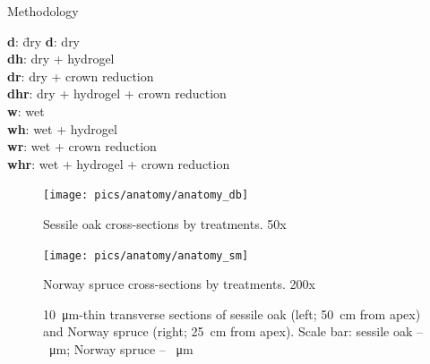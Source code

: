 \documentclass[final]{beamer}
\newlength{\colwidth}
\begin{document}
\begin{frame}[t]
\begin{columns}[t]
\begin{column}{\colwidth}
\begin{block}{Methodology}
\begin{minipage}[t]{0.45\textwidth}
\begin{tabbing}
    \textbf{d}: \quad\= dry \kill
    \textbf{d}: \> dry \\
    \textbf{dh}: \> dry + hydrogel \\
    \textbf{dr}: \> dry + crown reduction\\
    \textbf{dhr}: \> dry + hydrogel + crown reduction \\
    \textbf{w}: \> wet \\
    \textbf{wh}: \> wet + hydrogel \\
    \textbf{wr}: \> wet + crown reduction\\
    \textbf{whr}: \> wet + hydrogel + crown reduction
\end{tabbing}
\end{minipage}\hfill


\begin{figure}
    \begin{minipage}{0.5\textwidth}
        \centering \texttt{[image: pics/anatomy/anatomy\_db]}
        \caption*{Sessile oak cross-sections by treatments. 50x}
        \label{fig:anatomy_db}
    \end{minipage}\hfill
    \begin{minipage}{0.5\textwidth}
        \centering \texttt{[image: pics/anatomy/anatomy\_sm]}
        \caption*{Norway spruce cross-sections by treatments. 200x}
        \label{fig:anatomy_sm}
    \end{minipage}\hfill
    \caption{\SI{10}{\micro\meter}-thin transverse sections of sessile oak (left; \SI{50}{\centi\meter} from apex) and Norway spruce (right; \SI{25}{\centi\meter} from apex). Scale bar: sessile oak -- \SI{}{\micro\meter}; Norway spruce -- \SI{}{\micro\meter}}
    \label{fig:anatomy}
\end{figure}
\end{block}


\end{column}
\end{columns}
\end{frame}
\end{document}
